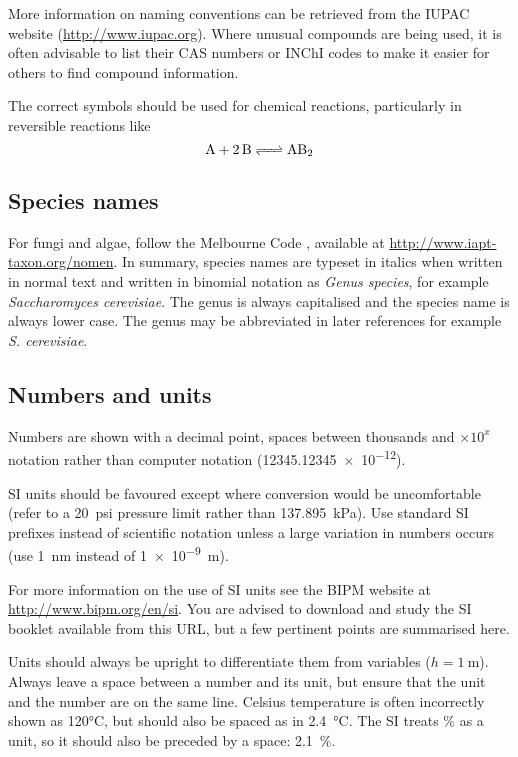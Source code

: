\documentclass[a5paper, 10pt]{article}
\begin{document}
More information on naming conventions can be retrieved from the IUPAC
website (\url{http://www.iupac.org}).  Where unusual compounds are being used, it is often advisable to list their CAS numbers or INChI codes to make it easier for others to find compound information.

The correct symbols should be used for chemical reactions,
particularly in reversible reactions like
\begin{displaymath}
  \ce{A + 2B <=> AB2}
\end{displaymath}

\subsection{Species names}
For fungi and algae, follow the Melbourne Code \citep{mcneill2012international}, available at
\url{http://www.iapt-taxon.org/nomen}. In summary, species names are typeset in
italics when written in normal text and written in binomial notation as
\textit{Genus species}, for example \textit{Saccharomyces cerevisiae}. The genus
is always capitalised and the species name is
always lower case. The genus may be abbreviated in later references for example
\textit{S. cerevisiae}.

\subsection{Numbers and units}
Numbers are shown with a decimal point, spaces between thousands and $\times 10^x$ notation rather than computer notation (\num{12345.12345e-12}).

SI units should be favoured except where conversion would be
uncomfortable (refer to a \SI{20}{psi} pressure limit rather than
\SI{137.895}{\kilo\pascal}).
Use standard
SI prefixes instead of scientific notation unless a large variation in
numbers occurs (use \SI{1}{\nano\meter} instead of \SI{1e-9}{\meter}).

For more information on the use of SI units see the BIPM website at \url{http://www.bipm.org/en/si}.  You are advised to download and study the SI booklet available from this URL, but a few pertinent points are summarised here.

Units should always be upright to differentiate them from variables ($h = \SI{1}{\meter}$).  
Always leave a space between a number and its
unit, but ensure that the unit and the number are on the same line.  
Celsius temperature is
often incorrectly shown as 120\si{\celsius}, but should also be spaced
as in \SI{2.4}{\celsius}.  The SI treats \% as a unit, so it should also be preceded by a space: \SI{2.1}{\%}.
\end{document}
